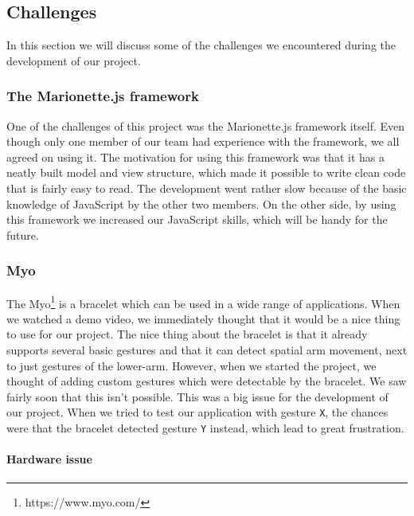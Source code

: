 \documentclass{article}
\begin{document}
\subsection{Challenges}
\label{sec:challenges}
In this section we will discuss some of the challenges we encountered during the development of our project.

\subsubsection{The Marionette.js framework}
One of the challenges of this project was the Marionette.js framework itself. Even though only one member of our team had experience with the framework, we all agreed on using it. The motivation for using this framework was that it has a neatly built model and view structure, which made it possible to write clean code that is fairly easy to read. The development went rather slow because of the basic knowledge of JavaScript by the other two members. On the other side, by using this framework we increased our JavaScript skills, which will be handy for the future.

\subsubsection{Myo}

The Myo\footnote{https://www.myo.com/} is a bracelet which can be used in a wide range of applications. When we watched a demo video, we immediately thought that it would be a nice thing to use for our project. The nice thing about the bracelet is that it already supports several basic gestures and that it can detect spatial arm movement, next to just gestures of the lower-arm. However, when we started the project, we thought of adding custom gestures which were detectable by the bracelet. We saw fairly soon that this isn't possible. This was a big issue for the development of our project. When we tried to test our application with gesture \texttt{X}, the chances were that the bracelet detected gesture \texttt{Y} instead, which lead to great frustration.

\paragraph{Hardware issue}
\end{document}
